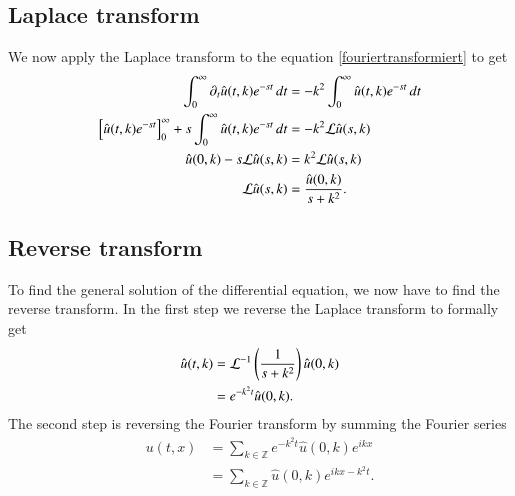 \subsection{Laplace transform}
We now apply the Laplace transform to the equation
\eqref{fouriertransformiert}
to get
\begin{align*}
\int_0^{\infty} \partial_t \hat u(t,k)e^{-st}\,dt
&=
-k^2\int_0^{\infty}\hat u(t,k)e^{-st}\,dt
\\
\left[\hat u(t,k)e^{-st}\right]_0^{\infty}
+
s\int_0^{\infty}\hat u(t,k)e^{-st}\,dt
&=
-k^2{\cal L}\hat u(s,k)
\\
\hat u(0,k)-s{\cal L}\hat u(s,k)&=k^2{\cal L}\hat u(s,k)
\\
{\cal L}\hat u(s,k)&=\frac{\hat u(0,k)}{s+k^2}.
\end{align*}

\subsection{Reverse transform}
To find the general solution of the differential equation, 
we now have to find the reverse transform.
In the first step we reverse the Laplace transform to
formally get
\begin{align*}
\hat u(t,k)&={\cal L}^{-1}\left(\frac1{s+k^2}\right)\hat u(0,k)
\\
&=e^{-k^2t}\hat u(0,k).
\end{align*}
The second step is reversing the Fourier transform by summing the
Fourier series
\begin{align*}
u(t,x)&=\sum_{k\in\mathbb Z}e^{-k^2t}\hat u(0,k)e^{ikx}
\\
&=\sum_{k\in\mathbb Z}\hat u(0,k)e^{ikx-k^2t}.
\end{align*}

